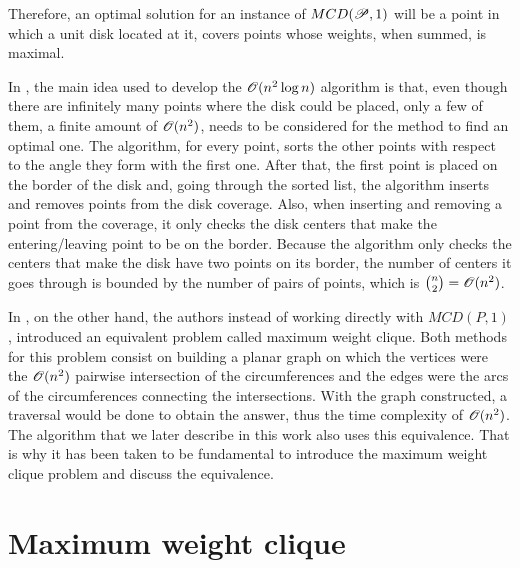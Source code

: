 Therefore, an optimal solution for an instance of $MCD(\mathscr{P},1)$ will be a point in which a unit disk located at it, covers points whose weights, when summed, is maximal. 

In \cite{drezner}, the main idea used to develop the $\mathscr{O}(n^2\log{n})$ algorithm is that, even though there are infinitely many points where the disk could be placed, only a few of them, a finite amount of $\mathscr{O}(n^2)$, needs to be considered for the method to find an optimal one.
The algorithm, for every point, sorts the other points with respect to the angle they form with the first one. After that, the first point is placed on the border of the disk and, going through the sorted list, the algorithm inserts and removes points from the disk coverage. Also, when inserting and removing a point from the coverage, it only checks the disk centers that make the entering/leaving point to be on the border. Because the algorithm only checks the centers that make the disk have two points on its border, the number of centers it goes through is bounded by the number of pairs of points, which is $\binom{n}{2} = \mathscr{O}(n^2)$.

In \cite{chazelle:1986, cabello:2006}, on the other hand, the authors instead of working directly with $MCD(P,1)$, introduced an equivalent problem called maximum weight clique. Both methods for this problem consist on building a planar graph on which the vertices were the $\mathscr{O}(n^2)$ pairwise intersection of the circumferences and the edges were the arcs of the circumferences connecting the intersections. With the graph constructed, a traversal would be done to obtain the answer, thus the time complexity of $\mathscr{O}(n^2)$.
The algorithm that we later describe in this work also uses this equivalence. That is why it has been taken to be fundamental to introduce the maximum weight clique problem and discuss the equivalence.

\section{Maximum weight clique}

